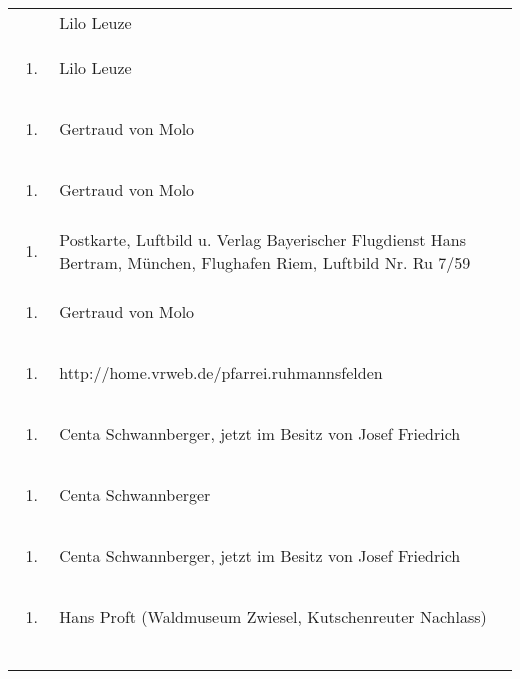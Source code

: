 \begin{flushleft}
\begin{supertabular}{m{1.2409999cm}m{14.604cm}}
\begin{enumerate}
\end{enumerate}
 &
Lilo Leuze\\
\begin{enumerate}
\item
\end{enumerate}
 &
Lilo Leuze\\
\begin{enumerate}
\item
\end{enumerate}
 &
Gertraud von Molo\\
\begin{enumerate}
\item
\end{enumerate}
 &
Gertraud von Molo\\
\begin{enumerate}
\item
\end{enumerate}
 &
Postkarte, Luftbild u. Verlag Bayerischer Flugdienst Hans Bertram,
München, Flughafen Riem, Luftbild Nr. Ru 7/59\\
\begin{enumerate}
\item
\end{enumerate}
 &
Gertraud von Molo\\
\begin{enumerate}
\item
\end{enumerate}
 &
http://home.vrweb.de/pfarrei.ruhmannsfelden\\
\begin{enumerate}
\item
\end{enumerate}
 &
Centa Schwannberger, jetzt im Besitz von Josef Friedrich\\
\begin{enumerate}
\item
\end{enumerate}
 &
Centa Schwannberger\\
\begin{enumerate}
\item
\end{enumerate}
 &
Centa Schwannberger, jetzt im Besitz von Josef Friedrich\\
\begin{enumerate}
\item
\end{enumerate}
 &
Hans Proft (Waldmuseum Zwiesel, Kutschenreuter Nachlass)\\
\begin{enumerate}

\end{enumerate}
\end{supertabular}
\end{flushleft}

